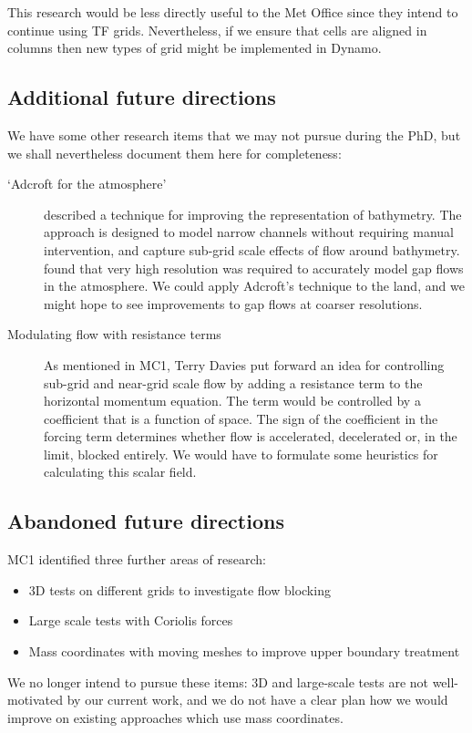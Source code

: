 \documentclass[a4paper]{article}
\begin{document}
This research would be less directly useful to the Met Office since they intend to continue using TF grids.  Nevertheless, if we ensure that cells are aligned in columns then new types of grid might be implemented in Dynamo.

\newpage
\subsection*{Additional future directions}
We have some other research items that we may not pursue during the PhD, but we shall nevertheless document them here for completeness:
\begin{description}
	\item[`Adcroft for the atmosphere']{\citet{adcroft2013} described a technique for improving the representation of bathymetry.  The approach is designed to model narrow channels without requiring manual intervention, and capture sub-grid scale effects of flow around bathymetry.  \citet{gohm2004} found that very high resolution was required to accurately model gap flows in the atmosphere.  We could apply Adcroft's technique to the land, and we might hope to see improvements to gap flows at coarser resolutions.}
	\item[Modulating flow with resistance terms]{As mentioned in MC1, Terry Davies put forward an idea for controlling sub-grid and near-grid scale flow by adding a resistance term to the horizontal momentum equation.  The term would be controlled by a coefficient that is a function of space.  The sign of the coefficient in the forcing term determines whether flow is accelerated, decelerated or, in the limit, blocked entirely.  We would have to formulate some heuristics for calculating this scalar field.}
\end{description}

\subsection*{Abandoned future directions}
MC1 identified three further areas of research:
\begin{itemize}
	\item 3D tests on different grids to investigate flow blocking
	\item Large scale tests with Coriolis forces
	\item Mass coordinates with moving meshes to improve upper boundary treatment
\end{itemize}
We no longer intend to pursue these items: 3D and large-scale tests are not well-motivated by our current work, and we do not have a clear plan how we would improve on existing approaches which use mass coordinates. 
\end{document}
